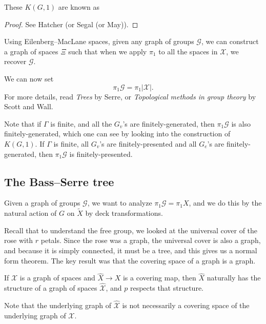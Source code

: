 \documentclass[a4paper]{article}
\begin{document}
These $K(G, 1)$ are known as 
\begin{proof}
  See Hatcher (or Segal (or May)).
\end{proof}

Using Eilenberg--MacLane spaces, given any graph of groups $\mathcal{G}$, we can construct a graph of spaces $\Xi$ such that when we apply $\pi_1$ to all the spaces in $\mathcal{X}$, we recover $\mathcal{G}$.

We can now set
\[
  \pi_1 \mathcal{G} = \pi_1|\mathcal{X}|.
\]
For more details, read \emph{Trees} by Serre, or \emph{Topological methods in group theory} by Scott and Wall.

Note that if $\Gamma$ is finite, and all the $G_v$'s are finitely-generated, then $\pi_1\mathcal{G}$ is also finitely-generated, which one can see by looking into the construction of $K(G, 1)$. If $\Gamma$ is finite, all $G_v$'s are finitely-presented and all $G_e$'s are finitely-generated, then $\pi_1 \mathcal{G}$ is finitely-presented.

\subsection{The Bass--Serre tree}
Given a graph of groups $\mathcal{G}$, we want to analyze $\pi_ 1\mathcal{G} = \pi_1 X$, and we do this by the natural action of $G$ on $\tilde{X}$ by deck transformations.

Recall that to understand the free group, we looked at the universal cover of the rose with $r$ petals. Since the rose was a graph, the universal cover is also a graph, and because it is simply connected, it must be a tree, and this gives us a normal form theorem. The key result was that the covering space of a graph is a graph.

\begin{lemma}
  If $\mathcal{X}$ is a graph of spaces and $\hat{X} \to X$ is a covering map, then $\hat{X}$ naturally has the structure of a graph of spaces $\hat{\mathcal{X}}$, and $p$ respects that structure.
\end{lemma}
Note that the underlying graph of $\hat{\mathcal{X}}$ is not necessarily a covering space of the underlying graph of $\mathcal{X}$.
\end{document}
